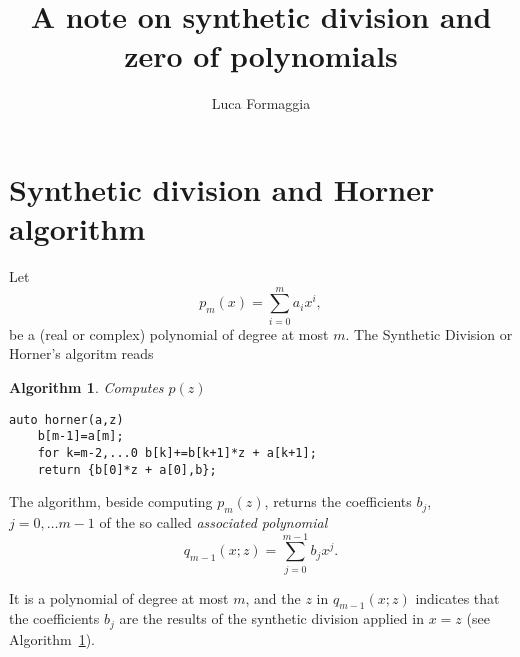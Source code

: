 \documentclass[10pt,a4paper]{article}
\author{Luca Formaggia}
\title{A note on synthetic division and zero of polynomials}
\theoremstyle{definition}%
\newtheorem{algo}{Algorithm}
\begin{document}
 
 \section{Synthetic division and Horner algorithm}
 Let
 \[
 p_m(x)=\sum_{i=0}^{m} a_i x^i,
 \]
be a (real or complex) polynomial of degree at most $m$. The Synthetic Division or Horner's algoritm reads

\begin{algo}\label{alg:horner}
\emph{Computes $p(z)$}
\begin{lstlisting}
auto horner(a,z)
    b[m-1]=a[m];
    for k=m-2,...0 b[k]+=b[k+1]*z + a[k+1]; 
    return {b[0]*z + a[0],b}; 
\end{lstlisting}
\end{algo}
The algorithm, beside computing $p_m(z)$, returns the coefficients $b_j$, $j=0,\ldots m-1$ of the so called \emph{associated polynomial}
\begin{equation}
\label{eq:associated}
q_{m-1}(x;z)=\sum_{j=0}^{m-1}b_j x^j.
\end{equation}

It is a polynomial of degree at most $m$, and the $z$ in $q_{m-1}(x;z)$ indicates that the coefficients $b_j$ are the results of the synthetic division applied in $x=z$ (see Algorithm~\ref{alg:horner}). 
\end{document}
